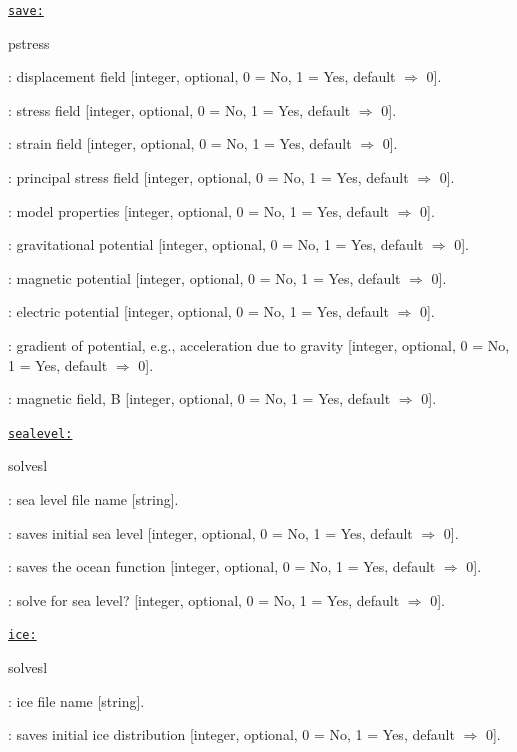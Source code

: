 \texttt{\underline{save:}}
\begin{adescription}{pstress}
  \item[disp]: displacement field [integer, optional, 0 = No, 1 = Yes, default $\Rightarrow$ 0].
  \item[stress]: stress field [integer, optional, 0 = No, 1 = Yes, default $\Rightarrow$ 0].
  \item[strain]: strain field [integer, optional, 0 = No, 1 = Yes, default $\Rightarrow$ 0].
  \item[pstress]: principal stress field [integer, optional, 0 = No, 1 = Yes, default $\Rightarrow$ 0].
  \item[model]: model properties [integer, optional, 0 = No, 1 = Yes, default $\Rightarrow$ 0].
  \item[gpot]: gravitational potential [integer, optional, 0 = No, 1 = Yes, default $\Rightarrow$ 0].
  \item[mpot]: magnetic potential [integer, optional, 0 = No, 1 = Yes, default $\Rightarrow$ 0].
  \item[epot]: electric potential [integer, optional, 0 = No, 1 = Yes, default $\Rightarrow$ 0].
  \item[agrav]: gradient of potential, e.g., acceleration due to gravity [integer, optional, 0 = No, 1 = Yes, default $\Rightarrow$ 0].
  \item[magb]: magnetic field, B [integer, optional, 0 = No, 1 = Yes, default $\Rightarrow$ 0].
  \\
\end{adescription}


\texttt{\underline{sealevel:}}
\begin{adescription}{solvesl}
  \item[slfile]: sea level file name  [string].
  \item[savesl0]: saves initial sea level [integer, optional, 0 = No, 1 = Yes, default $\Rightarrow$ 0].
  \item[saveOF]: saves the ocean function [integer, optional, 0 = No, 1 = Yes, default $\Rightarrow$ 0].
  \item[solvesl]: solve for sea level? [integer, optional, 0 = No, 1 = Yes, default $\Rightarrow$ 0].
  \\
\end{adescription}


\texttt{\underline{ice:}}
\begin{adescription}{solvesl}
  \item[icefile]: ice file name  [string].
  \item[saveice0]: saves initial ice distribution [integer, optional, 0 = No, 1 = Yes, default $\Rightarrow$ 0].
  \\
\end{adescription}


